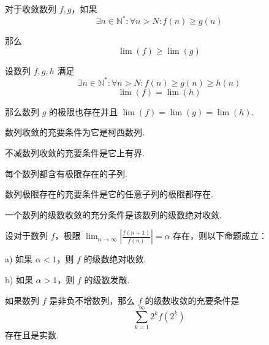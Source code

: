 \begin{theorem}
    对于收敛数列 $f,g$，如果
    \[\exists n \in \mathbb{N}^*: \forall n > N: f(n) \geqslant g(n)\]

    那么
    \[\lim(f) \geqslant \lim(g)\]
\end{theorem}\vspace{9pt}

\begin{theorem}
    设数列 $f,g,h$ 满足
    \[\exists n \in \mathbb{N}^*: \forall n > N: f(n) \geqslant g(n) \geqslant h(n)\]
    \[\lim(f) = \lim(h)\]
    
    那么数列 $g$ 的极限也存在并且 $\lim(f) = \lim(g) = \lim(h)$.
\end{theorem}\vspace{9pt}

\begin{theorem}
    数列收敛的充要条件为它是柯西数列.
\end{theorem}\vspace{9pt}

\begin{theorem}
    不减数列收敛的充要条件是它上有界.
\end{theorem}\vspace{9pt}

\begin{theorem}
    每个数列都含有极限存在的子列.
\end{theorem}\vspace{9pt}

\begin{theorem}
    数列极限存在的充要条件是它的任意子列的极限都存在.
\end{theorem}\vspace{9pt}

\begin{theorem}
    一个数列的级数收敛的充分条件是该数列的级数绝对收敛.
\end{theorem}\vspace{9pt}

\begin{theorem}
    设对于数列 $f$，极限 $\displaystyle \lim_{n \rightarrow \infty} \left| \frac{f(n+1)}{f(n)}\right| = \alpha$ 存在，则以下命题成立：

    a) 如果 $\alpha < 1$，则 $f$ 的级数绝对收敛.

    b) 如果 $\alpha > 1$，则 $f$ 的级数发散.
\end{theorem}\vspace{9pt}

\begin{theorem}
    如果数列 $f$ 是非负不增数列，那么 $f$ 的级数收敛的充要条件是
    \[\sum_{k=1}^{\infty} 2^k f(2^k)\]
    存在且是实数.
\end{theorem}\vspace{9pt}

